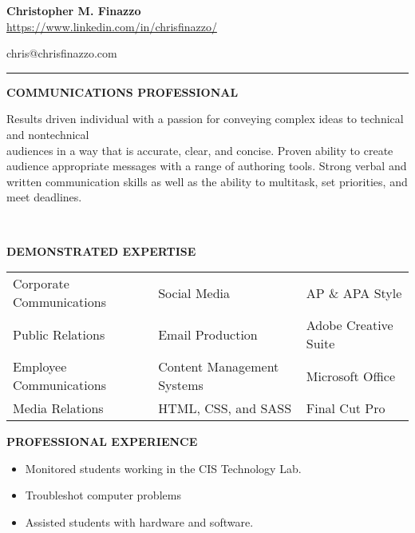 \documentclass[letterpaper,12pt]{article}
\begin{document}
\begin{center}
\textbf
{\Large{Christopher M. Finazzo}} \\
\href{https://www.linkedin.com/in/chrisfinazzo/}{https://www.linkedin.com/in/chrisfinazzo/}
\end{center}
\hfill \hfill {chris@chrisfinazzo.com}
\vspace*{0.20cm}
\hrule
\vspace*{0.20cm}
\begin{center}
\textbf
{COMMUNICATIONS PROFESSIONAL}
\end{center}
\noindent
\begin{raggedright}
Results driven individual with a passion for conveying complex ideas to technical and nontechnical\\ audiences in a way that is accurate, clear, and concise. Proven ability to create audience appropriate messages with a range of authoring tools. Strong verbal and written communication skills as well as the ability to multitask, set priorities, and meet deadlines.
\end{raggedright}\\
\begin{center}
\textbf{DEMONSTRATED EXPERTISE}\\
\end{center}
\begin{center}
\begin{tabular}{lll}
Corporate Communications & Social Media & AP \& APA Style\\
Public Relations & Email Production & Adobe Creative Suite\\
Employee Communications & Content Management Systems & Microsoft Office\\
Media Relations & HTML, CSS, and SASS & Final Cut Pro\\
\end{tabular}
\end{center}
\begin{center}
\textbf{PROFESSIONAL EXPERIENCE}
\end{center}
%
\begin{itemize}%
  \item
  Monitored students working in the CIS Technology Lab.
\item
  Troubleshot computer problems
\item
  Assisted students with hardware and software.
\end{itemize}
\end{document}
